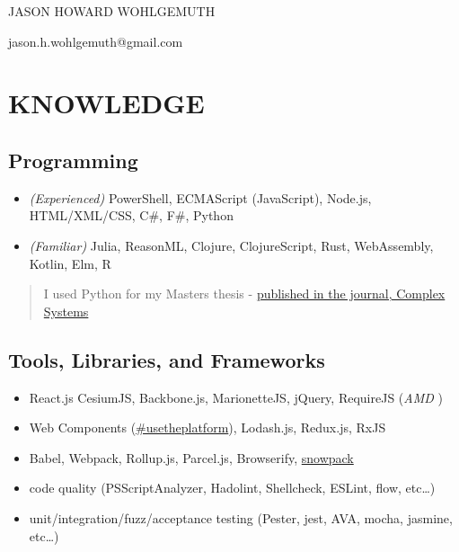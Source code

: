 \documentclass[10pt]{article}
\def\tightlist{}
\begin{document}
\begin{center}\Huge {JASON HOWARD WOHLGEMUTH}\end{center}
\begin{center}jason.h.wohlgemuth@gmail.com\end{center}

\hypertarget{knowledge}{%
\section{KNOWLEDGE}\label{knowledge}}

\hypertarget{programming}{%
\subsection{Programming}\label{programming}}

\begin{itemize}
\tightlist
\item
  \emph{(Experienced)} PowerShell, ECMAScript (JavaScript), Node.js,
  HTML/XML/CSS, C\#, F\#, Python
\item
  \emph{(Familiar)} Julia, ReasonML, Clojure, ClojureScript, Rust,
  WebAssembly, Kotlin, Elm, R
\end{itemize}

\begin{quote}
I used Python for my Masters thesis -
\href{https://www.complex-systems.com/abstracts/v23_i03_a01/}{published
in the journal, Complex Systems}
\end{quote}

\hypertarget{tools-libraries-and-frameworks}{%
\subsection{Tools, Libraries, and
Frameworks}\label{tools-libraries-and-frameworks}}

\begin{itemize}
\tightlist
\item
  React.js CesiumJS, Backbone.js, MarionetteJS, jQuery, RequireJS
  (\emph{AMD })
\item
  Web Components
  (\href{https://twitter.com/hashtag/usetheplatform?src=hash}{\#usetheplatform}),
  Lodash.js, Redux.js, RxJS
\item
  Babel, Webpack, Rollup.js, Parcel.js, Browserify,
  \href{https://www.pika.dev/blog/pika-web-a-future-without-webpack/}{snowpack}
\item
  code quality (PSScriptAnalyzer, Hadolint, Shellcheck, ESLint, flow,
  etc\ldots)
\item
  unit/integration/fuzz/acceptance testing (Pester, jest, AVA, mocha,
  jasmine, etc\ldots)
\end{itemize}
\end{document}

